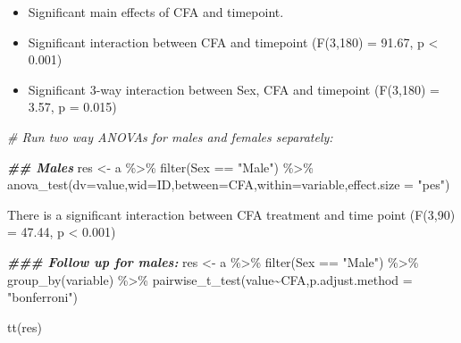\documentclass[
]{book}
\newenvironment{Shaded}{\begin{snugshade}}{\end{snugshade}}
\newcommand{\AttributeTok}[1]{\textcolor[rgb]{0.77,0.63,0.00}{#1}}
\newcommand{\CommentTok}[1]{\textcolor[rgb]{0.56,0.35,0.01}{\textit{#1}}}
\newcommand{\DocumentationTok}[1]{\textcolor[rgb]{0.56,0.35,0.01}{\textbf{\textit{#1}}}}
\newcommand{\FunctionTok}[1]{\textcolor[rgb]{0.00,0.00,0.00}{#1}}
\newcommand{\NormalTok}[1]{#1}
\newcommand{\OtherTok}[1]{\textcolor[rgb]{0.56,0.35,0.01}{#1}}
\newcommand{\SpecialCharTok}[1]{\textcolor[rgb]{0.00,0.00,0.00}{#1}}
\newcommand{\StringTok}[1]{\textcolor[rgb]{0.31,0.60,0.02}{#1}}
\begin{document}
\begin{itemize}
\item
  Significant main effects of CFA and timepoint.
\item
  Significant interaction between CFA and timepoint (F(3,180) = 91.67, p \textless{} 0.001)
\item
  Significant 3-way interaction between Sex, CFA and timepoint (F(3,180) = 3.57, p = 0.015)
\end{itemize}

\begin{Shaded}
\begin{Highlighting}[]
\CommentTok{\# Run two way ANOVAs for males and females separately: }

\DocumentationTok{\#\# Males}
\NormalTok{res }\OtherTok{\textless{}{-}}\NormalTok{ a }\SpecialCharTok{\%\textgreater{}\%}
  \FunctionTok{filter}\NormalTok{(Sex }\SpecialCharTok{==} \StringTok{"Male"}\NormalTok{) }\SpecialCharTok{\%\textgreater{}\%}
  \FunctionTok{anova\_test}\NormalTok{(}\AttributeTok{dv=}\NormalTok{value,}\AttributeTok{wid=}\NormalTok{ID,}\AttributeTok{between=}\NormalTok{CFA,}\AttributeTok{within=}\NormalTok{variable,}\AttributeTok{effect.size =} \StringTok{"pes"}\NormalTok{)}
\end{Highlighting}
\end{Shaded}

There is a significant interaction between CFA treatment and time point (F(3,90) = 47.44, p \textless{} 0.001)

\begin{Shaded}
\begin{Highlighting}[]
\DocumentationTok{\#\#\# Follow up for males: }
\NormalTok{res }\OtherTok{\textless{}{-}}\NormalTok{ a }\SpecialCharTok{\%\textgreater{}\%} 
  \FunctionTok{filter}\NormalTok{(Sex }\SpecialCharTok{==} \StringTok{"Male"}\NormalTok{) }\SpecialCharTok{\%\textgreater{}\%}
  \FunctionTok{group\_by}\NormalTok{(variable) }\SpecialCharTok{\%\textgreater{}\%}
  \FunctionTok{pairwise\_t\_test}\NormalTok{(value}\SpecialCharTok{\textasciitilde{}}\NormalTok{CFA,}\AttributeTok{p.adjust.method =} \StringTok{"bonferroni"}\NormalTok{)}

\FunctionTok{tt}\NormalTok{(res)}
\end{Highlighting}
\end{Shaded}
\end{document}
